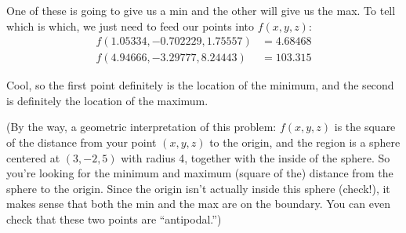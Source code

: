 \documentclass[10pt]{article}
\newenvironment{red}{\color{red}}{\ignorespacesafterend}
\begin{document}
\begin{enumerate}[leftmargin=0pt]
\begin{red}
One of these is going to give us a min and the other will give us the max. To tell which is which, we just need to feed our points into $f(x,y,z)$:
\begin{align*}
    f(1.05334, -0.702229, 1.75557) &= 4.68468 \\
    f(4.94666, -3.29777, 8.24443) &= 103.315
\end{align*}

Cool, so the first point definitely is the location of the minimum, and the second is definitely the location of the maximum.

(By the way, a geometric interpretation of this problem: $f(x,y,z)$ is the square of the distance from your point $(x,y,z)$ to the origin, and the region is a sphere centered at $(3, -2, 5)$ with radius 4, together with the inside of the sphere. So you're looking for the minimum and maximum (square of the) distance from the sphere to the origin. Since the origin isn't actually inside this sphere (check!), it makes sense that both the min and the max are on the boundary. You can even check that these two points are ``antipodal.'')
\end{red}

\end{enumerate}

\end{document}
